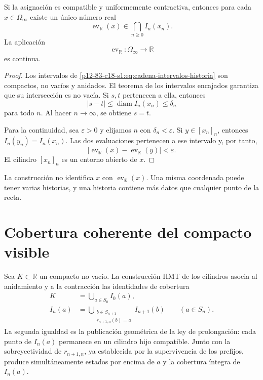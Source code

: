 \begin{theorem}
\label{p12-83-c18-s1:thm:evaluacion-unica-historia-u024}
Si la asignación es compatible y uniformemente contractiva, entonces para
cada \(x\in\Omega_\infty\) existe un único número real
\begin{equation}
 \operatorname{ev}_{\mathbb R}(x)
 \in\bigcap_{n\geq0}I_n(x_n).
 \label{p12-83-c18-s1:eq:evaluacion-real-historia-u024}
\end{equation}
La aplicación
\begin{equation}
 \operatorname{ev}_{\mathbb R}:\Omega_\infty\longrightarrow\mathbb R
 \label{p12-83-c18-s1:eq:aplicacion-evaluacion-real-u024}
\end{equation}
es continua.
\end{theorem}

\begin{proof}
Los intervalos de \eqref{p12-83-c18-s1:eq:cadena-intervalos-historia} son compactos,
no vacíos y anidados. El teorema de los intervalos encajados garantiza que
su intersección es no vacía. Si \(s,t\) pertenecen a ella, entonces
\[
 |s-t|\leq\operatorname{diam}I_n(x_n)\leq\delta_n
\]
para todo \(n\). Al hacer \(n\to\infty\), se obtiene \(s=t\).

Para la continuidad, sea \(\varepsilon>0\) y elijamos \(n\) con
\(\delta_n<\varepsilon\). Si \(y\in[x_n]_n\), entonces
\(I_n(y_n)=I_n(x_n)\). Las dos evaluaciones pertenecen a ese intervalo y,
por tanto,
\[
 |\operatorname{ev}_{\mathbb R}(x)
  -\operatorname{ev}_{\mathbb R}(y)|<\varepsilon.
\]
El cilindro \([x_n]_n\) es un entorno abierto de \(x\).
\end{proof}

La construcción no identifica \(x\) con
\(\operatorname{ev}_{\mathbb R}(x)\). Una misma coordenada puede tener
varias historias, y una historia contiene más datos que cualquier punto de
la recta.

\section{Cobertura coherente del compacto visible}

Sea \(K\subset\mathbb R\) un compacto no vacío. La construcción HMT de los
cilindros asocia al anidamiento y a la contracción las identidades de
cobertura
\begin{align}
 K&=\bigcup_{a\in S_0}I_0(a),
 \label{p12-83-c18-s1:eq:cobertura-inicial-compacto-u024}\\
 I_n(a)&=
 \bigcup_{\substack{b\in S_{n+1}\\r_{n+1,n}(b)=a}}
 I_{n+1}(b)
 \qquad(a\in S_n).
 \label{p12-83-c18-s1:eq:cobertura-extensiones-compatible-u024}
\end{align}
La segunda igualdad es la publicación geométrica de la ley de prolongación:
cada punto de \(I_n(a)\) permanece en un cilindro hijo compatible. Junto con
la sobreyectividad de \(r_{n+1,n}\), ya establecida por la supervivencia de
los prefijos, produce simultáneamente estados por encima de \(a\) y la
cobertura íntegra de \(I_n(a)\).

